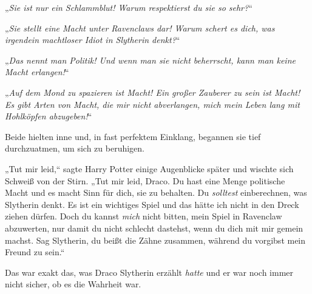 „\emph{Sie ist nur ein Schlammblut! Warum respektierst du sie so sehr?}“

„\emph{Sie stellt eine Macht unter Ravenclaws dar! Warum schert es dich, was irgendein machtloser Idiot in Slytherin denkt?}“

„\emph{Das nennt man Politik! Und wenn man sie nicht beherrscht, kann man keine Macht erlangen!}“

„\emph{Auf dem Mond zu spazieren ist Macht! Ein großer Zauberer zu sein ist Macht! Es gibt Arten von Macht, die mir nicht abverlangen, mich mein Leben lang mit Hohlköpfen abzugeben!}“

Beide hielten inne und, in fast perfektem Einklang, begannen sie tief durchzuatmen, um sich zu beruhigen.

„Tut mir leid,“ sagte Harry Potter einige Augenblicke später und wischte sich Schweiß von der Stirn. „Tut mir leid, Draco. Du hast eine Menge politische Macht und es macht Sinn für dich, sie zu behalten. Du \emph{solltest} einberechnen, was Slytherin denkt. Es ist ein wichtiges Spiel und das hätte ich nicht in den Dreck ziehen dürfen. Doch du kannst \emph{mich} nicht bitten, mein Spiel in Ravenclaw abzuwerten, nur damit du nicht schlecht dastehst, wenn du dich mit mir gemein machst. Sag Slytherin, du beißt die Zähne zusammen, während du vorgibst mein Freund zu sein.“

Das war exakt das, was Draco Slytherin erzählt \emph{hatte} und er war noch immer nicht sicher, ob es die Wahrheit war.


